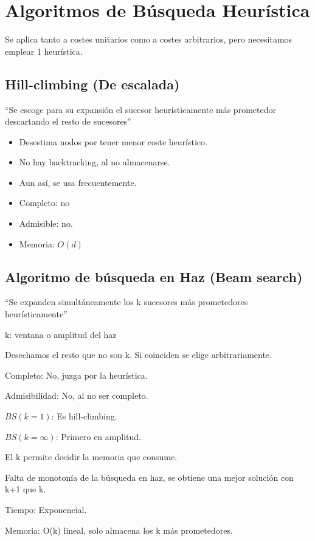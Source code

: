 \documentclass[12pt, twoside, openright]{report} %
\begin{document}
\section{Algoritmos de Búsqueda Heurística}

Se aplica tanto a costes unitarios como a costes arbitrarios, pero
necesitamos emplear 1 heurística.

\subsection{Hill-climbing (De escalada)}

``Se escoge para su expansión el sucesor heurísticamente más
prometedor descartando el resto de sucesores''

\begin{itemize}
	\item Desestima nodos por tener menor coste heurístico.
	\item No hay backtracking, al no almacenarse.
	\item Aun así, se usa frecuentemente.
	\item Completo: no
	\item Admisible: no.
	\item Memoria: \(O(d)\)
\end{itemize}

\subsection{Algoritmo de búsqueda en Haz (Beam search)}

``Se expanden simultáneamente los k sucesores más prometedores
heurísticamente''

k: ventana o amplitud del haz

Desechamos el resto que no son k. Si coinciden se elige
arbitrariamente.

Completo: No, juzga por la heurística.

Admisibilidad: No, al no ser completo.

\(BS(k=1)\): Es hill-climbing.

\(BS(k= \infty)\): Primero en amplitud.

El k permite decidir la memoria que consume.

Falta de monotonía de la búsqueda en haz, se obtiene una mejor
solución con k+1 que k.

Tiempo: Exponencial.

Memoria: O(k) lineal, solo almacena los k más prometedores.
\pagebreak
\end{document}
